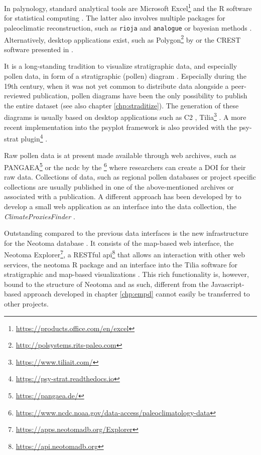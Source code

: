\begin{refsection}
In palynology, standard analytical tools are Microsoft Excel\footnote{\url{https://products.office.com/en/excel}} and the R software for statistical computing \citep{RCT2019}. The latter also involves multiple packages for paleoclimatic reconstruction, such as \texttt{rioja} \citep{Juggins2017} and \texttt{analogue} \citep{SimpsonOksanen2019, Simpson2007} or bayesian methods \citep{NolanTiptonBoothEtAl2019, Tipton2017}. Alternatively, desktop applications exist, such as Polygon\footnote{\url{http://polsystems.rits-paleo.com}} by \cite{NakagawaTarasovNishidaEtAl2002} or the CREST software presented in \cite{ChevalierCheddadiChase2014, Chevalier2019}.

It is a long-standing tradition to visualize stratigraphic data, and especially pollen data, in form of a stratigraphic (pollen) diagram \citep{Bradley1985, Grimm1988}. Especially during the 19th century, when it was not yet common to distribute data alongside a peer-reviewed publication, pollen diagrams have been the only possibility to publish the entire dataset (see also chapter \ref{chp:straditize}). The generation of these diagrams is usually based on desktop applications such as C2 \citep{Juggins2007}, Tilia\footnote{\url{https://www.tiliait.com/}} \citep{Grimm1988, Grimm1991}. A more recent implementation into the psyplot framework \citep[chapter \ref{chp:psyplot}]{Sommer2017} is also provided with the psy-strat plugin\footnote{\url{https://psy-strat.readthedocs.io}} \citep{Sommer2019}.

Raw pollen data is at present made available through web archives, such as PANGAEA\footnote{\url{https://pangaea.de/}} or the \gls{ncdc} by the \footnote{\url{https://www.ncdc.noaa.gov/data-access/paleoclimatology-data}} where researchers can create a DOI for their raw data. Collections of data, such as regional pollen databases or project specific collections \citep[e.g.][]{WhitmoreGajewskiSawadaEtAl2005, DavisZanonCollinsEtAl2013} are usually published in one of the above-mentioned archives or associated with a publication. A different approach has been developed by \cite{BollietBrockmannMassonDelmotteEtAl2016} to develop a small web application as an interface into the data collection, the \textit{ClimateProxiesFinder} \citep[chapter \ref{chp:empd}]{Brockmann2016}.

Outstanding compared to the previous data interfaces is the new infrastructure for the Neotoma database \citep{WilliamsGrimmBloisEtAl2018}. It consists of the map-based web interface, the Neotoma Explorer\footnote{\url{https://apps.neotomadb.org/Explorer}}, a RESTful api\footnote{\url{https://api.neotomadb.org}} that allows an interaction with other web services, the neotoma R package \citep{GoringDawsonSimpsonEtAl2015} and an interface into the Tilia software for stratigraphic and map-based visualizations \citep{WilliamsGrimmBloisEtAl2018}. This rich functionality is, however, bound to the structure of Neotoma and as such, different from the Javascript-based approach developed in chapter \ref{chp:empd} cannot easily be transferred to other projects.



\end{refsection}

